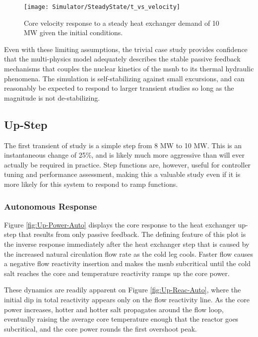 \begin{figure}[ht!]
    \centering
    \texttt{[image: Simulator/SteadyState/t\_vs\_velocity]}
    \caption[Steady state velocity response]{Core velocity response to a steady heat exchanger demand of 10 MW given the initial conditions.}
    \label{fig:SS-Velocity}
\end{figure}

Even with these limiting assumptions, the trivial case study provides confidence that the multi-physics model adequately describes the stable passive feedback mechanisms that couples the nuclear kinetics of the \acs{msnb} to its thermal hydraulic phenomena. The simulation is self-stabilizing against small excursions, and can reasonably be expected to respond to larger transient studies so long as the magnitude is not de-stabilizing.

\subsection{Up-Step}
The first transient of study is a simple step from 8 MW to 10 MW. This is an instantaneous change of 25\%, and is likely much more aggressive than will ever actually be required in practice. Step functions are, however, useful for controller tuning and performance assessment, making this a valuable study even if it is more likely for this system to respond to ramp functions.

\subsubsection{Autonomous Response}
Figure \ref{fig:Up-Power-Auto} displays the core response to the heat exchanger up-step that results from only passive feedback. The defining feature of this plot is the inverse response immediately after the heat exchanger step that is caused by the increased natural circulation flow rate as the cold leg cools. Faster flow causes a negative flow reactivity insertion and makes the \acs{msnb} subcritical until the cold salt reaches the core and temperature reactivity ramps up the core power. 

These dynamics are readily apparent on Figure \ref{fig:Up-Reac-Auto}, where the initial dip in total reactivity appears only on the flow reactivity line. As the core power increases, hotter and hotter salt propagates around the flow loop, eventually raising the average core temperature enough that the reactor goes subcritical, and the core power rounds the first overshoot peak. 

